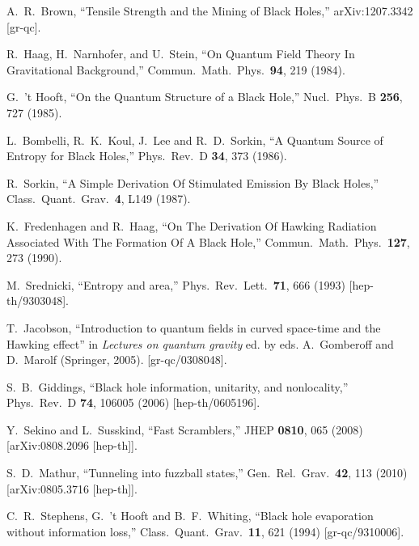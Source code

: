 \documentclass[12pt]{article}
\begin{document}
{\begin{thebibliography}{99}
  A.~R.~Brown,
  ``Tensile Strength and the Mining of Black Holes,''
  arXiv:1207.3342 [gr-qc].

  R.~Haag, H.~Narnhofer, and U.~Stein,
  ``On Quantum Field Theory In Gravitational Background,''
  Commun.\ Math.\ Phys.\  {\bf 94}, 219 (1984).

  G.~'t Hooft,
  ``On the Quantum Structure of a Black Hole,''
  Nucl.\ Phys.\ B {\bf 256}, 727 (1985).


  L.~Bombelli, R.~K.~Koul, J.~Lee and R.~D.~Sorkin,
  ``A Quantum Source of Entropy for Black Holes,''
  Phys.\ Rev.\ D {\bf 34}, 373 (1986).

  R.~Sorkin,
  ``A Simple Derivation Of Stimulated Emission By Black Holes,''
  Class.\ Quant.\ Grav.\  {\bf 4}, L149 (1987).


  K.~Fredenhagen and R.~Haag,
  ``On The Derivation Of Hawking Radiation Associated With The Formation Of A Black Hole,''
  Commun.\ Math.\ Phys.\  {\bf 127}, 273 (1990).

  M.~Srednicki,
  ``Entropy and area,''
  Phys.\ Rev.\ Lett.\  {\bf 71}, 666 (1993)
  [hep-th/9303048].

  T.~Jacobson,
  ``Introduction to quantum fields in curved space-time and the Hawking effect'' in
  {\it Lectures on quantum gravity} ed. by eds. A.~Gomberoff and D.~Marolf (Springer, 2005).
  [gr-qc/0308048].

  S.~B.~Giddings,
  ``Black hole information, unitarity, and nonlocality,''
  Phys.\ Rev.\ D {\bf 74}, 106005 (2006)
  [hep-th/0605196].


  Y.~Sekino and L.~Susskind,
  ``Fast Scramblers,''
  JHEP {\bf 0810}, 065 (2008)
  [arXiv:0808.2096 [hep-th]].

  S.~D.~Mathur,
  ``Tunneling into fuzzball states,''
  Gen.\ Rel.\ Grav.\  {\bf 42}, 113 (2010)
  [arXiv:0805.3716 [hep-th]].

  C.~R.~Stephens, G.~'t Hooft and B.~F.~Whiting,
  ``Black hole evaporation without information loss,''
  Class.\ Quant.\ Grav.\  {\bf 11}, 621 (1994)
  [gr-qc/9310006].


\end{thebibliography}}
\end{document}
